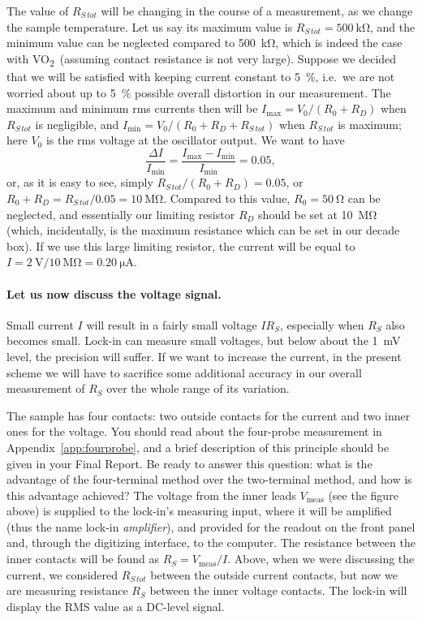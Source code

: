 \documentclass[11pt,a4paper]{article}
\newcommand{\VOtwo}{VO\textsubscript{2}}
\begin{document}
The value of $R_{S\,tot}$ will be changing in the course of a measurement, as we
change the sample temperature. Let us say its maximum value is
$R_{S\,tot} = \SI{500}{\kilo\ohm}$, and the minimum value can be neglected
compared to \SI{500}{\kilo\ohm}, which is indeed the case with \VOtwo\ (assuming
contact resistance is not very large). Suppose we decided that we will be
satisfied with keeping current constant to \SI{5}{\percent}, i.e.\ we are not
worried about up to \SI{5}{\percent} possible overall distortion in our
measurement. The maximum and minimum rms currents then will be
$I_{\max} = V_0/(R_0+R_D)$ when $R_{S\,tot}$ is negligible, and
$I_{\min} = V_0/(R_0+R_D+R_{S\,tot})$ when $R_{S\,tot}$ is maximum; here $V_0$
is the rms voltage at the oscillator output. We want to have
\begin{equation}
  \frac{\Delta I}{I_{\min}}
    = \frac{I_{\max}-I_{\min}}{I_{\min}} = 0.05 ,
\end{equation}
or, as it is easy to see, simply $R_{S\,tot}/(R_0+R_D) = 0.05$, or
$R_0 + R_D = R_{S\,tot}/0.05 = \SI{10}{\mega\ohm}$. Compared to this value,
$R_0 = \SI{50}{\ohm}$ can be neglected, and essentially our limiting resistor
$R_D$ should be set at \SI{10}{\mega\ohm} (which, incidentally, is the maximum
resistance which can be set in our decade box). If we use this large limiting
resistor, the current will be equal to
$I = \SI{2}{\volt}/\SI{10}{\mega\ohm} = \SI{0.20}{\micro\ampere}$.

\paragraph{Let us now discuss the voltage signal.}
Small current $I$ will result in a fairly small voltage $I R_S$, especially when
$R_S$ also becomes small. Lock-in can measure small voltages, but below about
the \SI{1}{\milli\volt} level, the precision will suffer. If we want to
increase the current, in the present scheme we will have to sacrifice some
additional accuracy in our overall measurement of $R_S$ over the whole range of
its variation.

The sample has four contacts: two outside contacts for the current and two
inner ones for the voltage. You should read about the four-probe measurement in
Appendix~\ref{app:fourprobe}, and a brief description of this principle should
be given in your Final Report. Be ready to answer this question: what is the
advantage of the four-terminal method over the two-terminal method, and how is
this advantage achieved? The voltage from the inner leads
$V_{\mathrm{meas}}$ (see the figure above) is supplied to the lock-in's
measuring input, where it will be amplified (thus the name lock-in
\emph{amplifier}), and provided for the readout on the front panel and, through
the digitizing interface, to the computer. The resistance between the inner contacts will be found as
$R_S = V_{\mathrm{meas}}/I$. Above, when we were discussing the current, we
considered $R_{S\,tot}$ between the outside current contacts, but now we are
measuring resistance $R_S$ between the inner voltage contacts. The lock-in will
display the RMS value as a DC-level signal.
\end{document}
